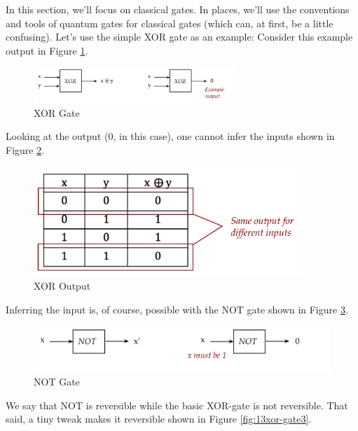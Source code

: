\documentclass[main.tex]{subfiles}
\begin{document}
    In this section, we'll focus on classical gates. In places, we'll use the conventions and tools of quantum gates for classical gates (which can, at first, be a little confusing). Let's use the simple XOR gate as an example: Consider this example output in Figure \ref{fig:10xor-gate1}.
    
    \begin{figure}
        \centering
        \includegraphics[width=3in]{notes/figs/n10/10xor-gate1.png}
        \caption{XOR Gate}
        \label{fig:10xor-gate1}
    \end{figure}
    
    Looking at the output (0, in this case), one cannot infer the inputs shown in Figure \ref{fig:11xor-gate1b}.
    
    \begin{figure}
        \centering
        \includegraphics[width=4in]{notes/figs/n10/11xor-gate1b.png}
        \caption{XOR Output}
        \label{fig:11xor-gate1b}
    \end{figure}
    
    Inferring the input is, of course, possible with the NOT gate shown in Figure \ref{fig:12xor-gate2}.
    
    \begin{figure}
        \centering
        \includegraphics[width=5in]{notes/figs/n10/12xor-gate2.png}
        \caption{NOT Gate}
        \label{fig:12xor-gate2}
    \end{figure}
    
    We say that NOT is reversible while the basic XOR-gate is not reversible. That said, a tiny tweak makes it reversible shown in Figure \ref{fig:13xor-gate3}.
    
\end{document}
